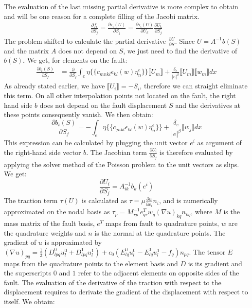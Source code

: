 \documentclass{report}
\begin{document}
The evaluation of the last missing partial derivative is more complex to obtain and will be one reason for a complete filling of the Jacobi matrix.
\begin{align}
	\label{eq:partialDerivative_df_dS}
    \frac{\partial f_i}{\partial S_j} = \frac{\partial \tau_i(U)}{\partial S_j} = \frac{\partial \tau_i(U)}{\partial U_k}\frac{\partial U_k}{\partial S_j}
\end{align}
The problem shifted to calculate the partial derivative $\frac{\partial U}{\partial S}$. Since $U = A^{-1}b(S)$ and the matrix $A$ does not depend on $S$, we just need to find the derivative of $b(S)$. We get, for elements on the fault:
\begin{align}
    \frac{\partial b_i(S)}{\partial S_j} &= \frac{\partial }{\partial S_j}\int_e \eta \{\{c_{mnkl}\epsilon_{kl}(w)\eta_n^e\}\}\llbracket U_m \rrbracket + \frac{\delta_e}{|e|^\beta}\llbracket U_m \rrbracket\llbracket w_m \rrbracket dx
\end{align}
As already stated earlier, we have $\llbracket U_i \rrbracket = -S_i$, therefore we can straight eliminate this term. On all other interpolation points not located on the fault, the right hand side $b$ does not depend on the fault displacement $S$ and the derivatives at these points consequently vanish. We then obtain:
\begin{equation}
    \frac{\partial b_i(S)}{\partial S_j} = -\int_e 
    \eta  \{\{c_{jnkl}\epsilon_{kl}(w)\eta_n^e\}\} +
    \frac{\delta_e}{|e|^\beta}\llbracket w_j \rrbracket dx
\end{equation}
This expression can be calculated by plugging the unit vector $e^i$ as argument of the right-hand side vector $b$. The Jacobian term $\frac{\partial U_i}{\partial S_j}$ is therefore evaluated by applying the solver method of the Poisson problem to the unit vectors as slips. We get:
\begin{equation}
    \frac{\partial U_i}{\partial S_j} = A_{ik}^{-1}b_k(e^i)
\end{equation}
The traction term $\tau(U)$ is calculated as $\tau = \mu \frac{\partial u}{\partial x_i}n_i$, and is numerically approximated on the nodal basis as $\tau_p = M_{rp}^{-1}e_{qr}^Tw_q(\nabla u)_{kq}n_{kq}$, where $M$ is the mass matrix of the fault basis, $e^T$ maps from fault to quadrature points, $w$ are the quadrature weights and $n$ is the normal at the quadrature points. The gradient of $u$ is approximated by $(\nabla u)_{pq} = \frac{1}{2}\left(D_{lpq}^0u_l^0 + D_{lpq}^1u_l^1\right) + c_0\left(E_{lq}^0u_l^0 - E_{lq}^1u_l^1 - f_q\right)n_{pq}$. The tensor $E$ maps from the quadrature points to the element basis and $D$ is its gradient and the superscripts $0$ and $1$ refer to the adjacent elements on opposite sides of the fault. The evaluation of the derivative of the traction with respect to the displacement requires to derivate the gradient of the displacement with respect to itself. We obtain: 
\end{document}

